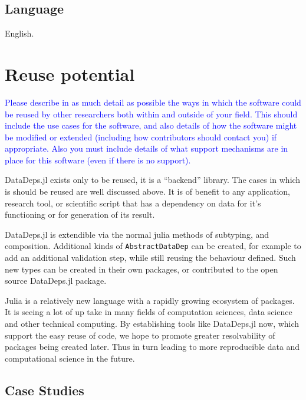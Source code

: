 \documentclass[dvinames]{jors}
\begin{document}
\subsection{Language}
English.

\section{Reuse potential}
\textcolor{blue}{Please describe in as much detail as possible the ways in which the software could be reused by other researchers both within and outside of your field. This should include the use cases for the software, and also details of how the software might be modified or extended (including how contributors should contact you) if appropriate. Also you must include details of what support mechanisms are in place for this software (even if there is no support).}

DataDeps.jl exists only to be reused, it is a ``backend'' library.
The cases in which is should be reused are well discussed above.
It is of benefit to any application, research tool, or scientific script that has a dependency on data for it's functioning or for generation of its result.

DataDeps.jl is extendible via the normal julia methods of subtyping, and composition.
Additional kinds of \texttt{AbstractDataDep} can be created, for example to add an additional validation step, while still reusing the behaviour defined.
Such new types can be created in their own packages, or contributed to the open source DataDeps.jl package.


Julia is a relatively new language with a rapidly growing ecosystem of packages.
It is seeing a lot of up take in many fields of computation sciences, data science and other technical computing.
By establishing tools like DataDeps.jl now, which support the easy reuse of code,
we hope to promote greater resolvability of packages being created later.
Thus in turn leading to more reproducible data and computational science in the future.


\subsection{Case Studies}\label{sec:case-studies}
\end{document}
